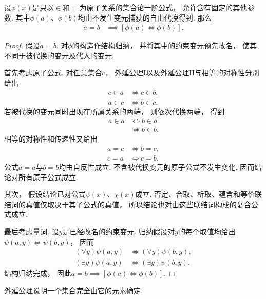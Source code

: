\begin{theorem}
    设\(\phi(x)\)是只以\(\in\)和\(=\)为原子关系的集合论一阶公式，
    允许含有固定的其他参数.
    其中\(\phi(a)\)、\(\phi(b)\)均由不发生变元捕获的自由代换得到.
    那么
    \begin{align*}
        a=b &\implies [\phi(a)\iff\phi(b)].
    \end{align*}
    \begin{proof}
        假设\(a=b\).
        对\(\phi\)的构造作结构归纳，
        并将其中的约束变元预先改名，
        使其不同于被代换的变元及代入的变元.

        首先考虑原子公式.
        对任意集合\(c\)，
        外延公理I以及外延公理II与相等的对称性分别给出
        \begin{align*}
            c\in a &\iff c\in b, \\
            a\in c &\iff b\in c.
        \end{align*}
        若被代换的变元同时出现在所属关系的两端，
        则依次代换两端，
        得到
        \begin{align*}
            a\in a &\iff b\in a \\
            &\iff b\in b.
        \end{align*}
        相等的对称性和传递性又给出
        \begin{align*}
            a=c &\iff b=c, \\
            c=a &\iff c=b.
        \end{align*}
        公式\(a=a\)与\(b=b\)均由自反性成立.
        不含被代换变元的原子公式不发生变化.
        因而结论对所有原子公式成立.

        其次，
        假设结论已对公式\(\psi(x)\)、\(\chi(x)\)成立.
        否定、合取、析取、蕴含和等价联结词的真值仅取决于其子公式的真值，
        所以结论也对由这些联结词构成的复合公式成立.

        最后考虑量词.
        设\(y\)是已经改名的约束变元.
        归纳假设对\(y\)的每个取值均给出\(\psi(a,y)\iff\psi(b,y)\)，
        因而
        \begin{align*}
            (\forall y)\psi(a,y) &\iff (\forall y)\psi(b,y), \\
            (\exists y)\psi(a,y) &\iff (\exists y)\psi(b,y).
        \end{align*}
        结构归纳完成，
        因此\(a=b\implies[\phi(a)\iff\phi(b)]\).
    \end{proof}
\end{theorem}

外延公理说明一个集合完全由它的元素确定.


